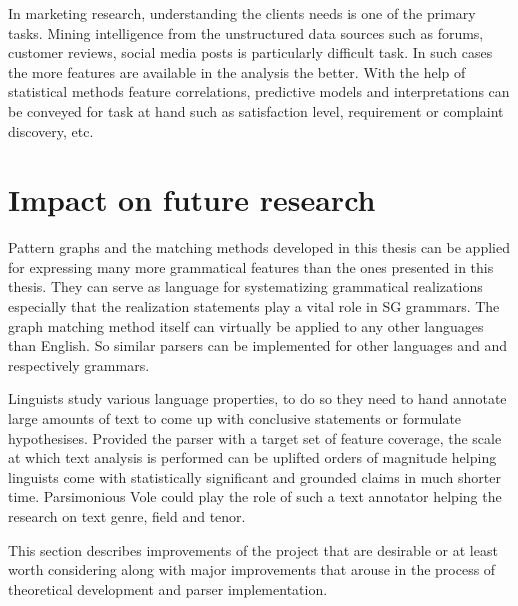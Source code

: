 In marketing research, understanding the clients needs is one of the primary tasks. Mining intelligence from the unstructured data sources such as forums, customer reviews, social media posts is particularly difficult task. In such cases the more features are available in the analysis the better. With the help of  statistical methods feature correlations, predictive models and interpretations can be conveyed for task at hand such as satisfaction level, requirement or complaint discovery, etc.

\section{Impact on future research}
\label{sec:future-work}

Pattern graphs and the matching methods developed in this thesis can be applied for expressing many more grammatical features than the ones presented in this thesis. They can serve as language for systematizing grammatical realizations especially that the realization statements play a vital role in SG grammars. The graph matching method itself can virtually be applied to any other languages than English. So similar parsers can be implemented for other languages and and respectively grammars. 

Linguists study various language properties, to do so they need to hand annotate large amounts of text to come up with conclusive statements or formulate hypothesises. Provided the parser with a target set of feature coverage, the scale at which text analysis is performed can be uplifted orders of magnitude helping linguists come with statistically significant and grounded claims in much shorter time. Parsimonious Vole could play the role of such a text annotator helping the research on text genre, field and tenor.



%
%
%

This section describes improvements of the project that are desirable or at least worth considering along with major improvements that arouse in the process of theoretical development and parser implementation. 

